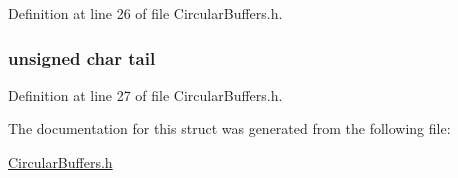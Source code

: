 Definition at line 26 of file Circular\+Buffers.\+h.

\hypertarget{structcircular_buffer_af18a1d7542e277284c4794593b049258}{
\subsubsection[{tail}]{\setlength{\rightskip}{0pt plus 5cm}unsigned char tail}}\label{structcircular_buffer_af18a1d7542e277284c4794593b049258}


Definition at line 27 of file Circular\+Buffers.\+h.



The documentation for this struct was generated from the following file\+:\begin{DoxyCompactItemize}
\item 
\hyperlink{_circular_buffers_8h}{Circular\+Buffers.\+h}\end{DoxyCompactItemize}
